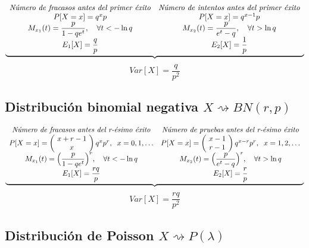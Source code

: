 \documentclass[11pt,twoside,titlepage,a4paper]{article}
\theoremstyle{definition}
\theoremstyle{plain_rojo}
\theoremstyle{remark}
\begin{document}
\begin{equation*}
\underbrace{\begin{array}{c c}
	\text{\emph{Número de fracasos antes del primer éxito}} & \text{\emph{Número de intentos antes del primer éxito}} \\
	P[X=x]=q^xp & P[X=x]=q^{x-1}p \\
	M_{x_1}(t)=\displaystyle\frac{p}{1-qe^t},\quad\forall t<-\ln q 
	& M_{x_2}(t)=\displaystyle\frac{p}{e^t-q},\quad\forall t>\ln q \\
	E_1[X]=\displaystyle\frac qp & E_2[X]=\displaystyle\frac 1p \\
	\end{array}}
\end{equation*}
$$Var[X]=\displaystyle\frac{q}{p^2}$$

\subsection{Distribución binomial negativa $X\rightsquigarrow BN(r,p)$}

\begin{equation*}
\underbrace{\begin{array}{c c}
	\text{\emph{Número de fracasos antes del r-ésimo éxito}} & \text{\emph{Número de pruebas antes del r-ésimo éxito}} \\
	P[X=x]=\left(\!\begin{array}{c}
	x+r-1 \\
	x
	\end{array}\!\right)q^xp^r,\;\; x=0,1,\ldots
	 & P[X=x]=\left(\!\begin{array}{c}
	x-1 \\
	r-1
	\end{array}\!\right)q^{x-r}p^r,\;\; x=1,2,\ldots \\
	M_{x_1}(t)=\Big(\displaystyle\frac{p}{1-qe^t}\Big)^r,\quad\forall t<-\ln q 
	& M_{x_2}(t)=\Big(\displaystyle\frac{p}{e^t-q}\Big)^r,\quad\forall t>\ln q \\
	E_1[X]=\displaystyle\frac{rq}{p} & E_2[X]=\displaystyle\frac rp \\
	\end{array}}
\end{equation*}
$$Var[X]=\displaystyle\frac{rq}{p^2}$$

\subsection{Distribución de Poisson $X\rightsquigarrow P(\lambda)$}
\end{document}

